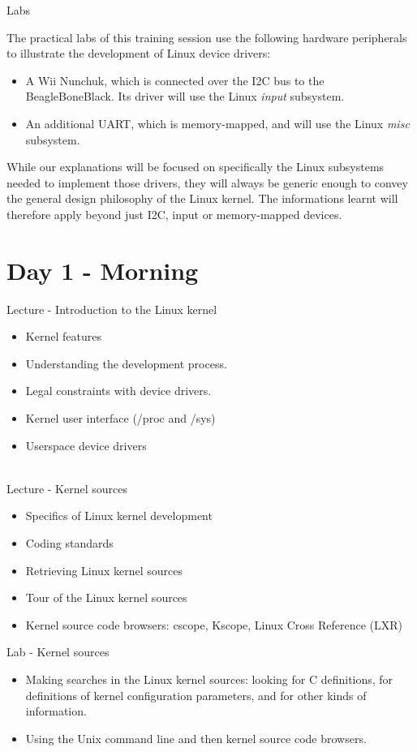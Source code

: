 \documentclass[a4paper,12pt,obeyspaces,spaces,hyphens]{article}
\begin{document}
\feagendaonecolumn
{Labs}
{
  The practical labs of this training session use the following
  hardware peripherals to illustrate the development of Linux device
  drivers:

  \begin{itemize}
  \item A Wii Nunchuk, which is connected over the I2C bus to the
    BeagleBoneBlack. Its driver will use the Linux {\em input}
    subsystem.
  \item An additional UART, which is memory-mapped, and will use the
    Linux {\em misc} subsystem.
  \end{itemize}

  While our explanations will be focused on specifically the Linux
  subsystems needed to implement those drivers, they will always be
  generic enough to convey the general design philosophy of the Linux
  kernel. The informations learnt will therefore apply beyond just
  I2C, input or memory-mapped devices.
}


\section{Day 1 - Morning}

\feagendaonecolumn
{Lecture - Introduction to the Linux kernel}
{
  \begin{itemize}
  \item Kernel features
  \item Understanding the development process.
  \item Legal constraints with device drivers.
  \item Kernel user interface (/proc and /sys)
  \item Userspace device drivers
  \end{itemize}
}
\\
\feagendatwocolumn
{Lecture - Kernel sources}
{
  \begin{itemize}
  \item Specifics of Linux kernel development
  \item Coding standards
  \item Retrieving Linux kernel sources
  \item Tour of the Linux kernel sources
  \item Kernel source code browsers: cscope, Kscope, Linux Cross
    Reference (LXR)
  \end{itemize}
}
{Lab - Kernel sources}
{
  \begin{itemize}
  \item Making searches in the Linux kernel sources: looking for C
    definitions, for definitions of kernel configuration parameters,
    and for other kinds of information.
  \item Using the Unix command line and then kernel source code
    browsers.
 \end{itemize}
}
\end{document}
